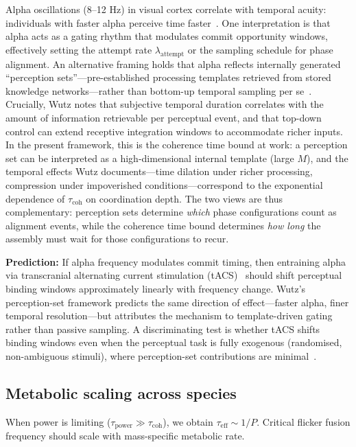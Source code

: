 \documentclass[12pt]{article}
\begin{document}
Alpha oscillations (8--12 Hz) in visual cortex correlate with temporal acuity: individuals with faster alpha perceive time faster~\cite{samaha2015,cecere2015}. One interpretation is that alpha acts as a gating rhythm that modulates commit opportunity windows, effectively setting the attempt rate $\lambda_{\mathrm{attempt}}$ or the sampling schedule for phase alignment. An alternative framing holds that alpha reflects internally generated ``perception sets''---pre-established processing templates retrieved from stored knowledge networks---rather than bottom-up temporal sampling per se~\cite{wutz2024}. Crucially, Wutz notes that subjective temporal duration correlates with the amount of information retrievable per perceptual event, and that top-down control can extend receptive integration windows to accommodate richer inputs. In the present framework, this is the coherence time bound at work: a perception set can be interpreted as a high-dimensional internal template (large $M$), and the temporal effects Wutz documents---time dilation under richer processing, compression under impoverished conditions---correspond to the exponential dependence of $\tau_{\mathrm{coh}}$ on coordination depth. The two views are thus complementary: perception sets determine \emph{which} phase configurations count as alignment events, while the coherence time bound determines \emph{how long} the assembly must wait for those configurations to recur.

\textbf{Prediction:} If alpha frequency modulates commit timing, then entraining alpha via transcranial alternating current stimulation (tACS)~\cite{helfrich2014} should shift perceptual binding windows approximately linearly with frequency change. Wutz's perception-set framework predicts the same direction of effect---faster alpha, finer temporal resolution---but attributes the mechanism to template-driven gating rather than passive sampling. A discriminating test is whether tACS shifts binding windows even when the perceptual task is fully exogenous (randomised, non-ambiguous stimuli), where perception-set contributions are minimal~\cite{wutz2024}.

\subsection{Metabolic scaling across species}

When power is limiting ($\tau_{\mathrm{power}} \gg \tau_{\mathrm{coh}}$), we obtain $\tau_{\mathrm{eff}} \sim 1/P$. Critical flicker fusion frequency should scale with mass-specific metabolic rate.
\end{document}
